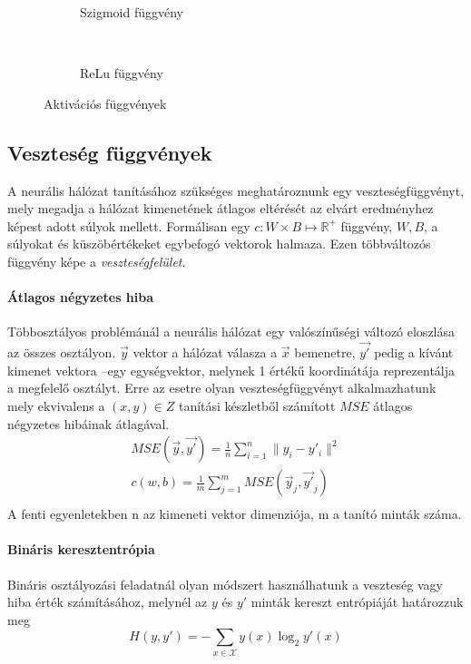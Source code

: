 \begin{figure}[h]
	\centering
	\begin{subfigure}[b]{0.3\textwidth}
		\def\svgwidth{0.5\columnwidth}
		
		\caption{Szigmoid függvény}
		\label{fig:sigmoid}
	\end{subfigure}
	~
	\begin{subfigure}[b]{0.3\textwidth}
		\def\svgwidth{0.5\columnwidth}
		
		\caption{ReLu függvény}
	\end{subfigure}
	\caption{Aktivációs függvények }
\end{figure}

\subsection{Veszteség függvények}
A neurális hálózat tanításához szükséges meghatároznunk egy veszteségfüggvényt, mely megadja a hálózat kimenetének átlagos eltérését az elvárt eredményhez képest adott súlyok mellett. Formálisan egy $c:W\times B \mapsto \mathbb{R}^+$ függvény, $W,B$, a súlyokat és küszöbértékeket egybefogó vektorok halmaza. Ezen többváltozós függvény képe a \emph{veszteségfelület}.

\paragraph[MSE]{Átlagos négyzetes hiba}
Többosztályos problémánál a neurális hálózat egy valószínűségi változó eloszlása az összes osztályon. $\vec{y}$ vektor a hálózat válasza a $\vec{x}$ bemenetre, $\vec{y'}$ pedig a kívánt kimenet vektora --egy egységvektor, melynek 1 értékű koordinátája reprezentálja a megfelelő osztályt. Erre az esetre olyan veszteségfüggvényt alkalmazhatunk mely ekvivalens a $(x,y)\in Z$ tanítási készletből számított $MSE$ átlagos négyzetes hibáinak átlagával.
\begin{align*}
	MSE(\vec{y},\vec{y'}) = \frac{1}{n}\sum_{i=1}^{n} \|y_i - y'_i\|^2\\
	c(w,b) = \frac{1}{m}\sum_{j=1}^{m} MSE(\vec{y}_j,\vec{y'}_j)\\
\end{align*}
A fenti egyenletekben n az kimeneti vektor dimenziója, m a tanító minták száma.

\paragraph{Bináris keresztentrópia}
Bináris osztályozási feladatnál olyan módszert használhatunk a veszteség  vagy hiba érték számításához, melynél az $y$ és $y'$ minták kereszt entrópiáját határozzuk meg
\begin{displaymath}
	H(y,y')= -\sum_{x\in \mathcal{X}}y(x)\log_2 y'(x)
\end{displaymath}

